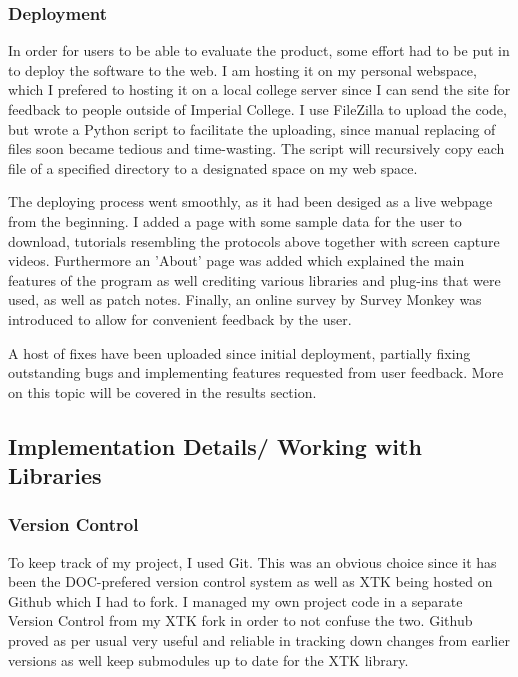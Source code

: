 \documentclass[a4paper,11pt,titlepage]{article}
\begin{document}
\subsubsection{Deployment}


In order for users to be able to evaluate the product, some effort had to be put in to deploy the software to the web. I am hosting it on my personal webspace, which I prefered to hosting it on a local college server since I can send the site for feedback to people outside of Imperial College. I use FileZilla to upload the code, but wrote a Python script to facilitate the uploading, since manual replacing of files soon became tedious and time-wasting. The script will recursively copy each file of a specified directory to a designated space on my web space.

The deploying process went smoothly, as it had been desiged as a live webpage from the beginning. I added a page with some sample data for the user to download, tutorials resembling the protocols above together with screen capture videos. Furthermore an 'About' page was added which explained the main features of the program as well crediting various libraries and plug-ins that were used, as well as patch notes. Finally, an online survey by Survey Monkey was introduced to allow for convenient feedback by the user.

A host of fixes have been uploaded since initial deployment, partially fixing outstanding bugs and implementing features requested from user feedback. More on this topic will be covered in the results section.


\subsection{Implementation Details/ Working with Libraries}

\subsubsection{Version Control}

To keep track of my project, I used Git. This was an obvious choice since it has been the DOC-prefered version control system as well as XTK being hosted on Github which I had to fork. I managed my own project code in a separate Version Control from my XTK fork in order to not confuse the two. Github proved as per usual very useful and reliable in tracking down changes from earlier versions as well keep submodules up to date for the XTK library. 
\end{document}
